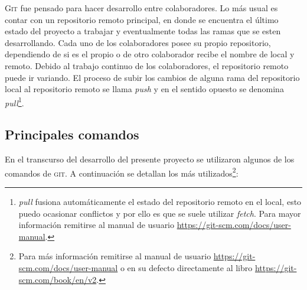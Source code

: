 \textsc{Git} fue pensado para hacer desarrollo entre colaboradores. Lo más usual es contar con un repositorio remoto principal, en donde se encuentra el último estado del proyecto a trabajar y eventualmente todas las ramas que se esten desarrollando. Cada uno de los colaboradores posee su propio repositorio, dependiendo de si es el propio o de otro colaborador recibe el nombre de local y remoto. Debido al trabajo continuo de los colaboradores, el repositorio remoto puede ir variando. El proceso de subir los cambios de alguna rama del repositorio local  al repositorio remoto  se llama \textit{push} y en el sentido opuesto se denomina \textit{pull}\footnote{\textit{pull} fusiona automáticamente el estado del repositorio remoto en el local, esto puedo ocasionar conflictos y por ello es que se suele utilizar \textit{fetch}. Para mayor información remitirse al manual de usuario \url{https://git-scm.com/docs/user-manual}.}. 


\newpage
\subsection{Principales comandos}

En el transcurso del desarrollo del presente proyecto se utilizaron algunos de los comandos de \textsc{git}. A continuación se detallan los más utilizados\footnote{\label{nota1}Para más información remitirse al manual de usuario \url{https://git-scm.com/docs/user-manual} o en su defecto directamente al libro \url{https://git-scm.com/book/en/v2}.}: 

